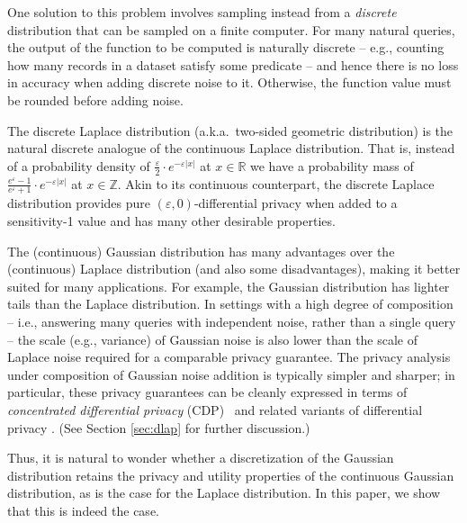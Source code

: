 \documentclass{jpcfinal} %
\newcommand{\eps}{\varepsilon}
\newcommand{\Z}{\mathbb{Z}}
\newcommand{\R}{\mathbb{R}}
\begin{document}
One solution to this problem involves sampling instead from a \emph{discrete} distribution that can be sampled on a finite computer. For many natural queries, the output of the function to be computed is naturally discrete -- e.g., counting how many records in a dataset satisfy some predicate -- and hence there is no loss in accuracy when adding discrete noise to it. Otherwise, the function value must be rounded before adding noise.

The discrete Laplace distribution (a.k.a.~two-sided geometric distribution) \citep{GhoshRS12,BalcerV17} is the natural discrete analogue of the continuous Laplace distribution. That is, instead of a probability density of $\frac{\eps}{2} \cdot e^{-\eps|x|}$ at $x \in \R$ we have a probability mass of $\frac{e^\eps-1}{e^\eps+1} \cdot e^{-\eps|x|}$ at $x \in \Z$. Akin to its continuous counterpart, the discrete Laplace distribution provides pure $(\eps,0)$-differential privacy when added to a sensitivity-1 value and has many other desirable properties. 

The (continuous) Gaussian distribution has many advantages over the (continuous) Laplace distribution (and also some disadvantages), making it better suited for many applications. For example, the Gaussian distribution has lighter tails than the Laplace distribution. In settings with a high degree of composition -- i.e., answering many queries with independent noise, rather than a single query -- the scale (e.g., variance) of Gaussian noise is also lower than the scale of Laplace noise required for a comparable privacy guarantee. The privacy analysis under composition of Gaussian noise addition is typically simpler and sharper; in particular, these privacy guarantees can be cleanly expressed in terms of \emph{concentrated differential privacy} (CDP)~\citep{DworkR16,BunS16} and related variants of differential privacy \citep{Mironov17,BunDRS18,DongRS19}. (See Section \ref{sec:dlap} for further discussion.)

Thus, it is natural to wonder whether a discretization of the Gaussian distribution retains the privacy and utility properties of the continuous Gaussian distribution, as is the case for the Laplace distribution. 
In this paper, we show that this is indeed the case. 
\end{document}
